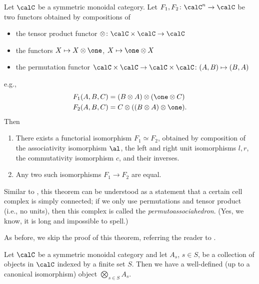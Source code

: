 \begin{theorem}\label{t:maclane-symmetric}\par

  \noindent
  Let $\calC$ be a symmetric monoidal category. Let $F_1, F_2\colon \calC^n\to
  \calC$ be two functors obtained by compositions of
  \begin{itemize}
    \item the tensor product functor $\otimes\colon \calC\times \calC\to \calC$
    \item the functors $X\mapsto X\otimes \one$, $X\mapsto \one \otimes X$
    \item the permutation functor $\calC\times \calC \to \calC\times \calC
          \colon (A, B)\mapsto (B,A)$
  \end{itemize}
  e.g.,
  \begin{align*}
    F_1(A,B,C)&=(B\otimes A)\otimes (\one\otimes C)\\
    F_2(A,B,C)&=C\otimes ((B\otimes  A)\otimes \one).
  \end{align*}
  Then
  \begin{enumerate}
    \item There exists a functorial isomorphism $F_1\simeq F_2$, obtained
      by composition of the associativity isomorphism $\al$, the left and right
      unit isomorphisms $l,r$, the commutativity isomorphism $c$, and their
      inverses.
    \item Any two such isomorphisms $F_1\to F_2$ are equal.
  \end{enumerate}
\end{theorem}
Similar to , this theorem can be understood as a statement
that a certain cell complex is simply connected; if we only use
permutations and tensor product (i.e., no units), then this complex is
called the \emph{permutoassociahedron}. (Yes, we know, it is long and
impossible to spell.)


As before, we skip the proof of this theorem, referring the reader to
\cite[Section XI.1]{mac-lane}.

\begin{corollary}\label{c:AS}
  Let $\calC$ be a symmetric monoidal category and let $A_s$, $s\in S$, be a
  collection of objects in $\calC$ indexed by a finite set $S$. Then we have a
  well-defined (up to a canonical isomorphism) object $ \bigotimes_{s\in S}
  A_s$.
\end{corollary}

